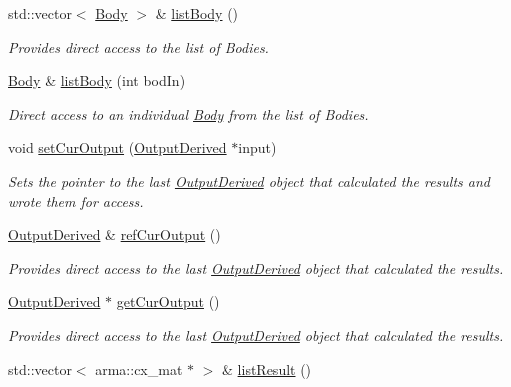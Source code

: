 \begin{DoxyCompactItemize}
std\-::vector$<$ \hyperlink{classosea_1_1ofreq_1_1_body}{Body} $>$ \& \hyperlink{classosea_1_1ofreq_1_1_outputs_body_a52d2c3942f90741a576d4f979cb1333b}{list\-Body} ()
\begin{DoxyCompactList}\small\item\em Provides direct access to the list of Bodies. \end{DoxyCompactList}\item 
\hyperlink{classosea_1_1ofreq_1_1_body}{Body} \& \hyperlink{classosea_1_1ofreq_1_1_outputs_body_a126aac91daccbc9a7dc39bc160bc34be}{list\-Body} (int bod\-In)
\begin{DoxyCompactList}\small\item\em Direct access to an individual \hyperlink{classosea_1_1ofreq_1_1_body}{Body} from the list of Bodies. \end{DoxyCompactList}\item 
void \hyperlink{classosea_1_1ofreq_1_1_outputs_body_af8cf39f2529bd1aa2e6f7987e3d59438}{set\-Cur\-Output} (\hyperlink{classosea_1_1ofreq_1_1_output_derived}{Output\-Derived} $\ast$input)
\begin{DoxyCompactList}\small\item\em Sets the pointer to the last \hyperlink{classosea_1_1ofreq_1_1_output_derived}{Output\-Derived} object that calculated the results and wrote them for access. \end{DoxyCompactList}\item 
\hyperlink{classosea_1_1ofreq_1_1_output_derived}{Output\-Derived} \& \hyperlink{classosea_1_1ofreq_1_1_outputs_body_a56090278e50472fd7aff1faa236a765d}{ref\-Cur\-Output} ()
\begin{DoxyCompactList}\small\item\em Provides direct access to the last \hyperlink{classosea_1_1ofreq_1_1_output_derived}{Output\-Derived} object that calculated the results. \end{DoxyCompactList}\item 
\hyperlink{classosea_1_1ofreq_1_1_output_derived}{Output\-Derived} $\ast$ \hyperlink{classosea_1_1ofreq_1_1_outputs_body_abc4561b06217666d8d87f7c493b5c147}{get\-Cur\-Output} ()
\begin{DoxyCompactList}\small\item\em Provides direct access to the last \hyperlink{classosea_1_1ofreq_1_1_output_derived}{Output\-Derived} object that calculated the results. \end{DoxyCompactList}\item 
std\-::vector$<$ arma\-::cx\-\_\-mat $\ast$ $>$ \& \hyperlink{classosea_1_1ofreq_1_1_outputs_body_a9921ceff88abf0deb7729921b244f8b2}{list\-Result} ()

\end{DoxyCompactItemize}
